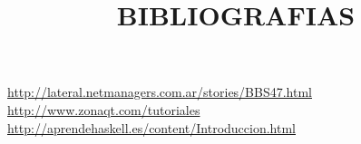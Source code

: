 \documentclass[12pt]{extbook}
\begin{document}
\begin{center}
\title{BIBLIOGRAFIAS}\maketitle
\end{center}

\href{http://lateral.netmanagers.com.ar/stories/BBS47.html}{http://lateral.netmanagers.com.ar/stories/BBS47.html}\\
\href{http://www.zonaqt.com/tutoriales}{http://www.zonaqt.com/tutoriales}\\
\href{http://aprendehaskell.es/content/Introduccion.html}{http://aprendehaskell.es/content/Introduccion.html}
\end{document}
